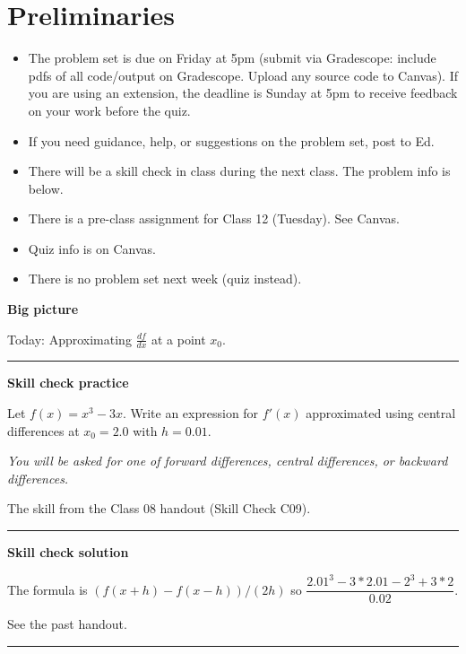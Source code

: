\documentclass[12pt,letterpaper,noanswers]{exam}
\begin{document}
 \pdfpageheight 11in 
  \pdfpagewidth 8.5in

\noindent 

\section*{Preliminaries}

\begin{itemize}
\itemsep0pt
\item The problem set is due on Friday at 5pm (submit via Gradescope: include pdfs of all code/output on Gradescope.  Upload any source code to Canvas).  If you are using an extension, the deadline is Sunday at 5pm to receive feedback on your work before the quiz.
\item If you need guidance, help, or suggestions on the problem set, post to Ed.
\item There will be a skill check in class during the next class.  The problem info is below.
\item There is a pre-class assignment for Class 12 (Tuesday).  See Canvas.
\item Quiz info is on Canvas.
\item There is no problem set next week (quiz instead).
\end{itemize}


\noindent\textbf{Big picture}

Today: Approximating $\frac{df}{dx}$ at a point $x_0$.

\vspace{0.2cm}
\hrule
\vspace{0.2cm}

\noindent \textbf{Skill check practice}
\begin{questions}
\item Let $f(x) = x^3 - 3x$.  Write an expression for $f'(x)$ approximated using central differences at $x_0 = 2.0$ with $h = 0.01$.

\emph{You will be asked for one of forward differences, central differences, or backward differences.}


\item The skill from the Class 08 handout (Skill Check C09).
\end{questions}


\vspace{0.2cm}
\hrule
\vspace{0.2cm}

\noindent \textbf{Skill check solution}
\begin{questions}
\item The formula is $(f(x+h) - f(x-h))/(2h)$ so $\dfrac{2.01^3-3*2.01 - 2^3+3*2}{0.02}$.

\item See the past handout.
\end{questions}
\vspace{0.2cm}
\hrule
\vspace{0.2cm}
\end{document}
